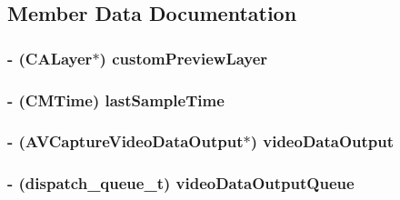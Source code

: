 \subsection{Member Data Documentation}
\hypertarget{interfaceCvVideoCamera_a46d53b968c51c20e96ef8947444b726d}{
\subsubsection[{custom\-Preview\-Layer}]{\setlength{\rightskip}{0pt plus 5cm}-\/ (C\-A\-Layer$\ast$) custom\-Preview\-Layer\hspace{0.3cm}{\ttfamily [protected]}}}\label{interfaceCvVideoCamera_a46d53b968c51c20e96ef8947444b726d}
\hypertarget{interfaceCvVideoCamera_a1730b56eb3f27f253fb609e368d11945}{
\subsubsection[{last\-Sample\-Time}]{\setlength{\rightskip}{0pt plus 5cm}-\/ (C\-M\-Time) last\-Sample\-Time\hspace{0.3cm}{\ttfamily [protected]}}}\label{interfaceCvVideoCamera_a1730b56eb3f27f253fb609e368d11945}
\hypertarget{interfaceCvVideoCamera_ab0f5857858359cba2580c21de5bc19dd}{
\subsubsection[{video\-Data\-Output}]{\setlength{\rightskip}{0pt plus 5cm}-\/ (A\-V\-Capture\-Video\-Data\-Output$\ast$) video\-Data\-Output\hspace{0.3cm}{\ttfamily [protected]}}}\label{interfaceCvVideoCamera_ab0f5857858359cba2580c21de5bc19dd}
\hypertarget{interfaceCvVideoCamera_a4b2bec06f6cd2ee1002dea79d95030df}{
\subsubsection[{video\-Data\-Output\-Queue}]{\setlength{\rightskip}{0pt plus 5cm}-\/ (dispatch\-\_\-queue\-\_\-t) video\-Data\-Output\-Queue\hspace{0.3cm}{\ttfamily [protected]}}}\label{interfaceCvVideoCamera_a4b2bec06f6cd2ee1002dea79d95030df}


